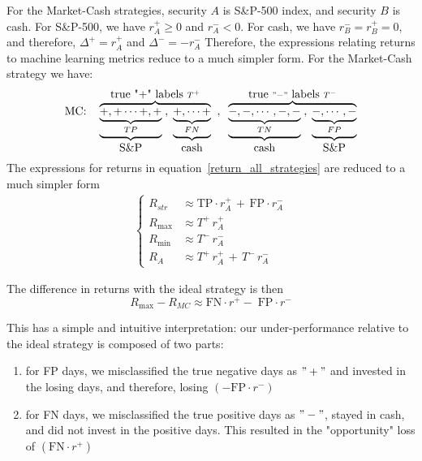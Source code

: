 \documentclass{article}
\begin{document}
For the Market-Cash strategies, security $A$ is S{\&}P-500 index, and security $B$ is cash.
For S{\&}P-500, we have $r_{A}^{+} \geq 0$ and $r_{A}^{-}<0$. For cash, we have $r_{B}^{-}=r_{B}^{+}=0$,
and therefore, $\Delta^{+}=r_{A}^{+}$ and $\Delta^{-}=-r_{A}^{-}$
Therefore, the expressions relating returns to machine learning metrics reduce to a much simpler form.
For the Market-Cash strategy we have:
\begin{equation*}
    \hbox{MC:}  \quad \overbrace{\underbrace{
    \underbrace{ +,+\cdots +,+}_{TP}}_{\hbox{S{\&}P}}\; , 
    \;\underbrace{\underbrace{+,\cdots + }_{FN}}_{\hbox{cash}}}^{\hbox{true "+" labels }T^{+}}
    \;\; , \;\; 
    \overbrace{
\underbrace{\underbrace{-,-,\cdots  ,-,-}_{TN}}_{\hbox{cash}}\; , \; 
\underbrace{\underbrace{ -,\cdots ,-}_{FP}}_{\hbox{S{\&}P}}}
^{\hbox{true } "-"
\hbox{ labels } T^{-}} 
\end{equation*}
The expressions for returns in equation~\eqref{return_all_strategies} are reduced to a much simpler form
\begin{equation}
\begin{split}
\begin{cases}
    R_{str} & \approx \text{TP}\cdot r_{A}^{+}\,  + \,
    \text{FP}\cdot r_{A}^{-} \\
      R_{\max} & \approx  T^{+} \, r_{A}^{+} \\
    R_{\min} & \approx  T^{-}\, r_{A}^{-} \\
        R_{A} &  \approx  T^{+}\, r_{A}^{+} \, + \, T^{-}\, r_{A}^{-}  
     \end{cases}
\end{split}
\label{return_all_mc_strategies}
\end{equation}

The difference in returns with the ideal strategy is then
\begin{equation}
 R_{\max}- R_{MC}  \approx  \text{FN}\cdot r^{+} -\; \text{FP}\cdot r^{-} 
    \label{mc_underperformance}
\end{equation}

This has a simple and intuitive interpretation: our under-performance 
relative to the ideal strategy is composed of two parts: 
\medskip
\begin{enumerate}[nosep]
    \item for FP days, we misclassified the true negative days as $"+"$ and invested in the losing days, and therefore, losing
       $(-\text{FP}\cdot   r^{-})$
    \item for FN days, we misclassified the true positive days as $"-"$, stayed in cash, and did not invest in the positive days. This resulted in the "opportunity" loss of $(\text{FN}\cdot  r^{+})$
\end{enumerate}
\end{document}
